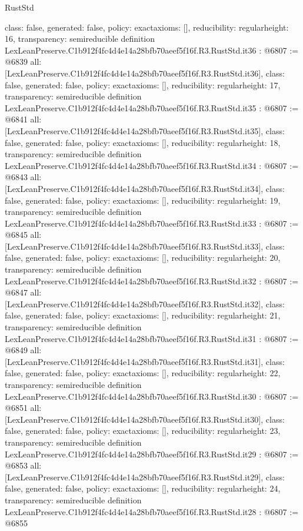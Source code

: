 \begin{lexlean}{RustStd}
\begin{coremodule}
{  class: false,
  generated: false,
  policy: exact{axioms: []},
  reducibility: regular{height: 16},
  transparency: semireducible
}
definition LexLeanPreserve.C1b912f4fc4d4e14a28bfb70aeef5f16f.R3.RustStd.it36 : @6807 := @6839 {
  all: [LexLeanPreserve.C1b912f4fc4d4e14a28bfb70aeef5f16f.R3.RustStd.it36],
  class: false,
  generated: false,
  policy: exact{axioms: []},
  reducibility: regular{height: 17},
  transparency: semireducible
}
definition LexLeanPreserve.C1b912f4fc4d4e14a28bfb70aeef5f16f.R3.RustStd.it35 : @6807 := @6841 {
  all: [LexLeanPreserve.C1b912f4fc4d4e14a28bfb70aeef5f16f.R3.RustStd.it35],
  class: false,
  generated: false,
  policy: exact{axioms: []},
  reducibility: regular{height: 18},
  transparency: semireducible
}
definition LexLeanPreserve.C1b912f4fc4d4e14a28bfb70aeef5f16f.R3.RustStd.it34 : @6807 := @6843 {
  all: [LexLeanPreserve.C1b912f4fc4d4e14a28bfb70aeef5f16f.R3.RustStd.it34],
  class: false,
  generated: false,
  policy: exact{axioms: []},
  reducibility: regular{height: 19},
  transparency: semireducible
}
definition LexLeanPreserve.C1b912f4fc4d4e14a28bfb70aeef5f16f.R3.RustStd.it33 : @6807 := @6845 {
  all: [LexLeanPreserve.C1b912f4fc4d4e14a28bfb70aeef5f16f.R3.RustStd.it33],
  class: false,
  generated: false,
  policy: exact{axioms: []},
  reducibility: regular{height: 20},
  transparency: semireducible
}
definition LexLeanPreserve.C1b912f4fc4d4e14a28bfb70aeef5f16f.R3.RustStd.it32 : @6807 := @6847 {
  all: [LexLeanPreserve.C1b912f4fc4d4e14a28bfb70aeef5f16f.R3.RustStd.it32],
  class: false,
  generated: false,
  policy: exact{axioms: []},
  reducibility: regular{height: 21},
  transparency: semireducible
}
definition LexLeanPreserve.C1b912f4fc4d4e14a28bfb70aeef5f16f.R3.RustStd.it31 : @6807 := @6849 {
  all: [LexLeanPreserve.C1b912f4fc4d4e14a28bfb70aeef5f16f.R3.RustStd.it31],
  class: false,
  generated: false,
  policy: exact{axioms: []},
  reducibility: regular{height: 22},
  transparency: semireducible
}
definition LexLeanPreserve.C1b912f4fc4d4e14a28bfb70aeef5f16f.R3.RustStd.it30 : @6807 := @6851 {
  all: [LexLeanPreserve.C1b912f4fc4d4e14a28bfb70aeef5f16f.R3.RustStd.it30],
  class: false,
  generated: false,
  policy: exact{axioms: []},
  reducibility: regular{height: 23},
  transparency: semireducible
}
definition LexLeanPreserve.C1b912f4fc4d4e14a28bfb70aeef5f16f.R3.RustStd.it29 : @6807 := @6853 {
  all: [LexLeanPreserve.C1b912f4fc4d4e14a28bfb70aeef5f16f.R3.RustStd.it29],
  class: false,
  generated: false,
  policy: exact{axioms: []},
  reducibility: regular{height: 24},
  transparency: semireducible
}
definition LexLeanPreserve.C1b912f4fc4d4e14a28bfb70aeef5f16f.R3.RustStd.it28 : @6807 := @6855 {
}
\end{coremodule}
\end{lexlean}
